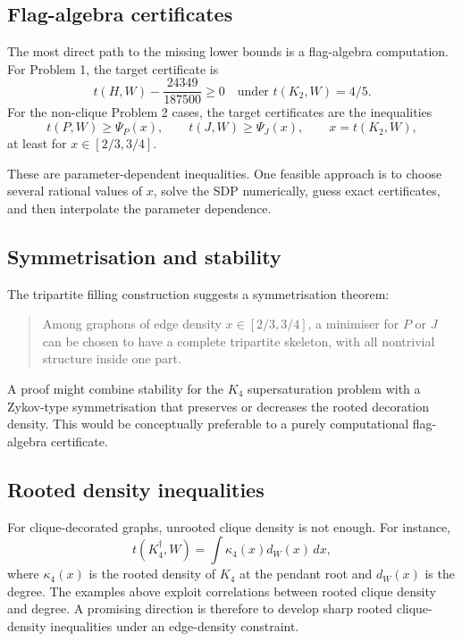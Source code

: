 \documentclass[11pt]{amsart}
\theoremstyle{definition}
\newcommand{\1}{\mathbf 1}
\newcommand{\dd}{\,d}
\begin{document}
\subsection{Flag-algebra certificates}

The most direct path to the missing lower bounds is a flag-algebra computation.  For Problem 1, the target certificate is
\[
   t(H,W)-\frac{24349}{187500}\ge 0
   \quad\text{under }t(K_2,W)=4/5.
\]
For the non-clique Problem 2 cases, the target certificates are the inequalities
\[
   t(P,W)\ge \Psi_P(x),
   \qquad t(J,W)\ge \Psi_J(x),
   \qquad x=t(K_2,W),
\]
at least for $x\in[2/3,3/4]$.

These are parameter-dependent inequalities.  One feasible approach is to choose several rational values of $x$, solve the SDP numerically, guess exact certificates, and then interpolate the parameter dependence.

\subsection{Symmetrisation and stability}

The tripartite filling construction suggests a symmetrisation theorem:

\begin{quote}
Among graphons of edge density $x\in[2/3,3/4]$, a minimiser for $P$ or $J$ can be chosen to have a complete tripartite skeleton, with all nontrivial structure inside one part.
\end{quote}

A proof might combine stability for the $K_4$ supersaturation problem with a Zykov-type symmetrisation that preserves or decreases the rooted decoration density.  This would be conceptually preferable to a purely computational flag-algebra certificate.

\subsection{Rooted density inequalities}

For clique-decorated graphs, unrooted clique density is not enough.  For instance,
\[
   t(K_4^\dagger,W)=\int \kappa_4(x) d_W(x)\dd x,
\]
where $\kappa_4(x)$ is the rooted density of $K_4$ at the pendant root and $d_W(x)$ is the degree.  The examples above exploit correlations between rooted clique density and degree.  A promising direction is therefore to develop sharp rooted clique-density inequalities under an edge-density constraint.
\end{document}
